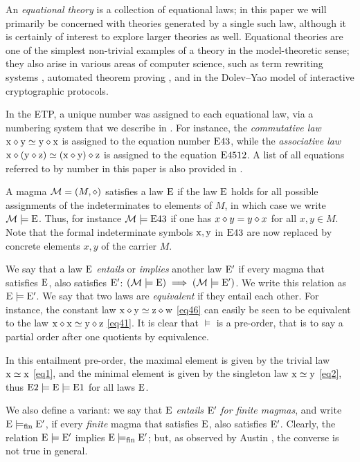 An \emph{equational theory} is a collection of equational laws; in this paper we will primarily be concerned with theories generated by a single such law, although it is certainly of interest to explore larger theories as well.  Equational theories are one of the simplest non-trivial examples of a theory in the model-theoretic sense; they also arise in various areas of computer science, such as term rewriting systems \cite{term-rewriting}, automated theorem proving \cite{mccune-survey}, and in the Dolev--Yao model \cite{dolev} of interactive cryptographic protocols.

In the ETP, a unique number was assigned to each equational law, via a numbering system that we describe in .  For instance, the \emph{commutative law} $\mathrm{x} \diamond \mathrm{y} \simeq \mathrm{y} \diamond \mathrm{x}$ is assigned to the equation number $\mathrm{E}43$, while the \emph{associative law} $\mathrm{x} \diamond (\mathrm{y} \diamond \mathrm{z}) \simeq (\mathrm{x} \diamond \mathrm{y}) \diamond \mathrm{z}$ is assigned to the equation $\mathrm{E}4512$.  A list of all equations referred to by number in this paper is also provided in .

A magma ${\mathcal{M}} = (M,\diamond)$ satisfies a law $\mathrm{E}$ if the law $\mathrm{E}$ holds for all possible assignments of the indeterminates to elements of $M$, in which case we write ${\mathcal{M}} \models \mathrm{E}$. Thus, for instance ${\mathcal{M}} \models \mathrm{E}43$ if one has $x \diamond y = y \diamond x$ for all $x,y \in M$.  Note that the formal indeterminate symbols $\mathrm{x}, \mathrm{y}$ in $\mathrm{E}43$ are now replaced by concrete elements $x,y$ of the carrier $M$.

We say that a law $\mathrm{E}$ \emph{entails} or \emph{implies} another law ${\mathrm{E}'}$ if every magma that satisfies $\mathrm{E}$, also satisfies ${\mathrm{E}'}$: $({\mathcal{M}} \models \mathrm{E}) \implies ({\mathcal{M}} \models {\mathrm{E}'})$.  We write this relation as ${\mathrm{E}} \models {\mathrm{E}'}$. We say that two laws are \emph{equivalent} if they entail each other. For instance, the constant law $\mathrm{x} \diamond \mathrm{y} \simeq \mathrm{z} \diamond \mathrm{w}$ \eqref{eq46} can easily be seen to be equivalent to the law $\mathrm{x} \diamond \mathrm{x} \simeq \mathrm{y} \diamond \mathrm{z}$ \eqref{eq41}.  It is clear that $\models$ is a pre-order, that is to say a partial order after one quotients by equivalence.

In this entailment pre-order, the maximal element is given by the trivial law $\mathrm{x}\simeq\mathrm{x}$ \eqref{eq1}, and the minimal element is given by the singleton law $\mathrm{x}\simeq \mathrm{y}$ \eqref{eq2}, thus $\mathrm{E}2 \models {\mathrm{E}} \models \mathrm{E}1$ for all laws $\mathrm{E}$.

We also define a variant: we say that $\mathrm{E}$ \emph{entails} ${\mathrm{E}'}$ \emph{for finite magmas}, and write ${\mathrm{E}} \models_{\mathrm{fin}} {\mathrm{E}'}$, if every \emph{finite} magma that satisfies $\mathrm{E}$, also satisfies ${\mathrm{E}'}$.  Clearly, the relation ${\mathrm{E}} \models {\mathrm{E}'}$ implies ${\mathrm{E}} \models_{\mathrm{fin}} {\mathrm{E}'}$; but, as observed by Austin \cite{austin_finite}, the converse is not true in general.

